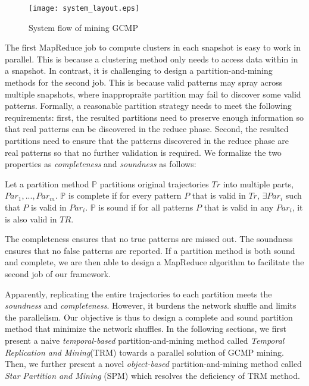 \begin{figure} [t]
\center
\texttt{[image: system\_layout.eps]}
\caption{System flow of mining GCMP}
\label{fig:overview}
\end{figure}



The first MapReduce job to compute clusters in each snapshot
is easy to work in parallel. This is because a clustering method only needs
to access data within in a snapshot. 
In contrast, it is challenging
to design a partition-and-mining methods for the second job. This is because
valid patterns may spray across multiple snapshots, where inappropraite partition
may fail to discover some valid patterns.
Formally, a reasonable partition strategy 
needs to meet the following requirements: first, the resulted partitions need
to preserve enough information so that real patterns can be discovered in the reduce phase. 
Second, the resulted partitions need to ensure that
the patterns discovered in the reduce phase are real patterns so that
no further validation is required. We formalize the two 
properties as \emph{completeness} and \emph{soundness} as follows:

\begin{definition}
Let a partition method $\mathbb{P}$ partitions original trajectories $Tr$ into multiple parts, $Par_1,...,Par_m$. $\mathbb{P}$ is complete if for every pattern $P$ that is valid in $Tr$, $\exists Par_i$ such that $P$ is valid in $Par_i$. $\mathbb{P}$ is sound if for all patterns $P$ that is valid in any $Par_i$, it is also valid in $TR$.
\end{definition}
The completeness ensures that no true patterns are missed out. The soundness ensures that no false patterns are reported. 
If a partition method is both sound and complete, we are then able to design a MapReduce algorithm to facilitate the second job
of our framework.

Apparently, replicating the entire trajectories to each 
partition meets the \emph{soundness} and \emph{completeness}. However, 
it burdens the network shuffle and limits the parallelism. 
Our objective is thus to design a complete and sound partition method that minimize the network shuffles.
In the following sections, we first present a naive \emph{temporal-based} partition-and-mining method called \emph{Temporal Replication and Mining}(TRM) towards a parallel solution of GCMP mining. Then,
we further present a novel \emph{object-based} partition-and-mining method
called \emph{Star Partition and Mining} (SPM) which resolves
the deficiency of TRM method.

